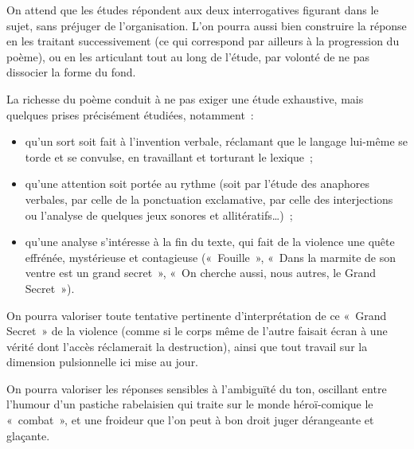{On attend que les études répondent aux deux interrogatives figurant dans le sujet,
sans préjuger de l'organisation. L'on pourra aussi bien construire la réponse en les
traitant successivement (ce qui correspond par ailleurs à la progression du poème), ou
en les articulant tout au long de l'étude, par volonté de ne pas dissocier la forme du
fond.

La richesse du poème conduit à ne pas exiger une étude exhaustive, mais quelques
prises précisément étudiées, notamment~:

\begin{itemize}
\item qu'un sort soit fait à l'invention verbale, réclamant que le langage lui-même se
torde et se convulse, en travaillant et torturant le lexique~;
\item qu'une attention soit portée au rythme (soit par l'étude des anaphores verbales,
par celle de la ponctuation exclamative, par celle des interjections ou l'analyse de
quelques jeux sonores et allitératifs…)~;
\item qu'une analyse s'intéresse à la fin du texte, qui fait de la violence une quête
effrénée, mystérieuse et contagieuse («~Fouille~», «~Dans la marmite de son ventre
est un grand secret~», «~On cherche aussi, nous autres, le Grand Secret~»).
\end{itemize}

On pourra valoriser toute tentative pertinente d'interprétation de ce «~Grand Secret~»
de la violence (comme si le corps même de l'autre faisait écran à une vérité dont
l'accès réclamerait la destruction), ainsi que tout travail sur la dimension pulsionnelle
ici mise au jour.

On pourra valoriser les réponses sensibles à l'ambiguïté du ton, oscillant entre l'humour
d'un pastiche rabelaisien qui traite sur le monde héroï-comique le «~combat~», et une
froideur que l'on peut à bon droit juger dérangeante et glaçante.}%

